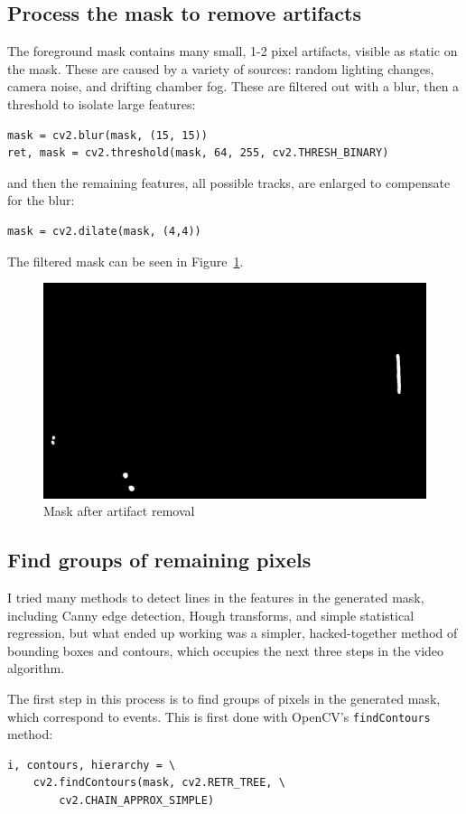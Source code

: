 \documentclass[notitlepage]{article}
\begin{document}
\subsection{Process the mask to remove artifacts}
The foreground mask contains many small, 1-2 pixel artifacts, visible as static on the mask.  These are caused by a variety of sources: random lighting changes, camera noise, and drifting chamber fog.  These are filtered out with a blur, then a threshold to isolate large features:
\begin{lstlisting}
mask = cv2.blur(mask, (15, 15))
ret, mask = cv2.threshold(mask, 64, 255, cv2.THRESH_BINARY)
\end{lstlisting}
and then the remaining features, all possible tracks, are enlarged to compensate for the blur:
\begin{lstlisting}
mask = cv2.dilate(mask, (4,4))
\end{lstlisting}
The filtered mask can be seen in Figure~\ref{fig:mask2}.

\begin{figure}[h]
	\centering
	\includegraphics[width=.45\textwidth]{mask2}
	\caption{Mask after artifact removal\label{fig:mask2}}
\end{figure}

\subsection{Find groups of remaining pixels}
I tried many methods to detect lines in the features in the generated mask, including Canny edge detection, Hough transforms, and simple statistical regression, but what ended up working was a simpler, hacked-together method of bounding boxes and contours, which occupies the next three steps in the video algorithm.

The first step in this process is to find groups of pixels in the generated mask, which correspond to events. This is first done with OpenCV's \texttt{findContours} method:
\begin{lstlisting}
i, contours, hierarchy = \
	cv2.findContours(mask, cv2.RETR_TREE, \
	    cv2.CHAIN_APPROX_SIMPLE)
\end{lstlisting}
\end{document}
